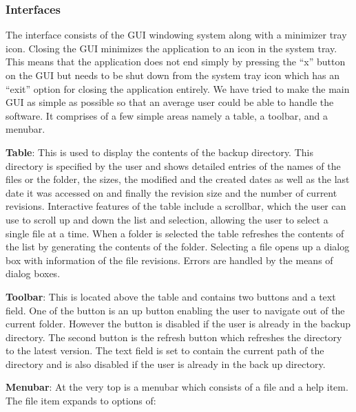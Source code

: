 \documentclass[12pt,a4paper]{article}
\begin{document}
\subsubsection{Interfaces}
The interface consists of the GUI windowing system along with a minimizer tray icon. Closing the GUI minimizes the application to an icon in the system tray. This means that the application does not end simply by pressing the “x” button on the GUI but needs to be shut down from the system tray icon which has an “exit” option for closing the application entirely. We have tried to make the main GUI as simple as possible so that an average user could be able to handle the software. It comprises of a few simple areas namely a table, a toolbar, and a menubar. 

\textbf{Table}: This is used to display the contents of the backup directory. This directory is specified by the user and shows detailed entries of the names of the files or the folder, the sizes, the modified and the created dates as well as the last date it was accessed on and finally the revision size and the number of current revisions. Interactive features of the table include a scrollbar, which the user can use to scroll up and down the list and selection, allowing the user to select a single file at a time. 
When a folder is selected the table refreshes the contents of the list by generating the contents of the folder. Selecting a file opens up a dialog box with information of the file revisions. Errors are handled by the means of dialog boxes. 

\textbf{Toolbar}: This is located above the table and contains two buttons and a text field. One of the button is an up button enabling the user to navigate out of the current folder. However the button is disabled if the user is already in the backup directory. The second button is the refresh button which refreshes the directory to the latest version. The text field is set to contain the current path of the directory and is also disabled if the user is already in the back up directory. 

\textbf{Menubar}: At the very top is a menubar which consists of a file and a help item. The file item expands to options of: 
\end{document}
